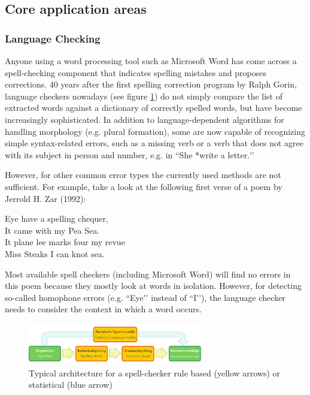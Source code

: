 \documentclass[]{../metanetpaper}
\begin{document}
\begin{multicols}{2}
\subsection{Core application areas}

\subsubsection{Language Checking}
Anyone using a word processing tool such as Microsoft Word has come
across a spell-checking component that indicates spelling mistakes and
proposes corrections. 40 years after the first spelling correction
program by Ralph Gorin, language checkers nowadays (see figure
\ref{fig:spellcheckerEn}) do not simply compare the list of extracted
words against a dictionary of correctly spelled words, but have become
increasingly sophisticated. In addition to language-dependent
algorithms for handling morphology (e.g. plural formation), some are
now capable of recognizing simple syntax-related errors, such as a
missing verb or a verb that does not agree with its subject in person
and number, e.g. in ``She *write a letter.{\mbox '}{\mbox '}

However, for other common error types the currently used methods are
not sufficient. For example, take a look at the following first verse
of a poem by Jerrold H. Zar (1992):
\begin{it}
\begin{center}
Eye have a spelling chequer,\\
It came with my Pea Sea.\\
It plane lee marks four my revue\\
Miss Steaks I can knot sea.\\
\end{center}
\end{it}
Most available spell checkers (including Microsoft Word) will find
no errors in this poem because they mostly look at words in
isolation. However, for detecting so-called homophone errors
(e.g. ``Eye{\mbox '}{\mbox '} instead of ``I{\mbox '}{\mbox '}), the language checker needs to consider
the context in which a word occurs.

\begin{figure}[!ht]
\begin{center}
  \includegraphics[width=3.0in]{../_media/language_checking}
\caption{Typical architecture for a spell-checker rule based (yellow arrows) or statistical (blue arrow)}
\label{fig:spellcheckerEn}
\end{center}
\end{figure}


\end{multicols}
\end{document}
